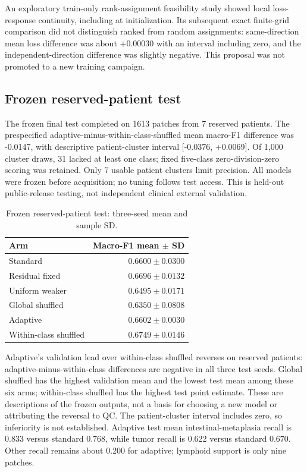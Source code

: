 \documentclass[conference]{IEEEtran}
\begin{document}
An exploratory train-only rank-assignment feasibility study showed local loss-response continuity, including at initialization. Its subsequent exact finite-grid comparison did not distinguish ranked from random assignments: same-direction mean loss difference was about $+0.00030$ with an interval including zero, and the independent-direction difference was slightly negative. This proposal was not promoted to a new training campaign.

\subsection{Frozen reserved-patient test}
The frozen final test completed on 1613 patches from 7 reserved patients. The prespecified adaptive-minus-within-class-shuffled mean macro-F1 difference was -0.0147, with descriptive patient-cluster interval [-0.0376, +0.0069]. Of 1,000 cluster draws, 31 lacked at least one class; fixed five-class zero-division-zero scoring was retained. Only 7 usable patient clusters limit precision. All models were frozen before acquisition; no tuning follows test access. This is held-out public-release testing, not independent clinical external validation.
\begin{table}[t]\caption{Frozen reserved-patient test: three-seed mean and sample SD.}\centering\begin{tabular}{lr}\toprule Arm & Macro-F1 mean $\pm$ SD\\\midrule
Standard & $0.6600\pm0.0300$\\
Residual fixed & $0.6696\pm0.0132$\\
Uniform weaker & $0.6495\pm0.0171$\\
Global shuffled & $0.6350\pm0.0808$\\
Adaptive & $0.6602\pm0.0030$\\
Within-class shuffled & $0.6749\pm0.0146$\\\bottomrule\end{tabular}\end{table} Adaptive's validation lead over within-class shuffled reverses on reserved patients: adaptive-minus-within-class differences are negative in all three test seeds. Global shuffled has the highest validation mean and the lowest test mean among these six arms; within-class shuffled has the highest test point estimate. These are descriptions of the frozen outputs, not a basis for choosing a new model or attributing the reversal to QC. The patient-cluster interval includes zero, so inferiority is not established. Adaptive test mean intestinal-metaplasia recall is 0.833 versus standard 0.768, while tumor recall is 0.622 versus standard 0.670. Other recall remains about 0.200 for adaptive; lymphoid support is only nine patches.
\end{document}
